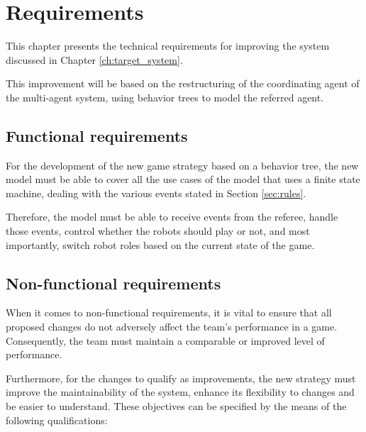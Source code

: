 \chapter{Requirements}
\label{ch:requirements}

This chapter presents the technical requirements for improving the system discussed in Chapter \ref{ch:target_system}.

This improvement will be based on the restructuring of the coordinating agent of the multi-agent system, using behavior trees to model the referred agent.

\section{Functional requirements}
\label{sec:functional_requirements}

For the development of the new game strategy based on a behavior tree, the new model must be able to cover all the use cases of the model that uses a finite state machine, dealing with the various events stated in Section \ref{sec:rules}.

Therefore, the model must be able to receive events from the referee, handle those events, control whether the robots should play or not, and most importantly, switch robot roles based on the current state of the game.

\section{Non-functional requirements}
\label{sec:non_functional_requirements}

When it comes to non-functional requirements, it is vital to ensure that all proposed changes do not adversely affect the team's performance in a game. Consequently, the team must maintain a comparable or improved level of performance.

Furthermore, for the changes to qualify as improvements, the new strategy must improve the maintainability of the system, enhance its flexibility to changes and be easier to understand. These objectives can be specified by the means of the following qualifications:

